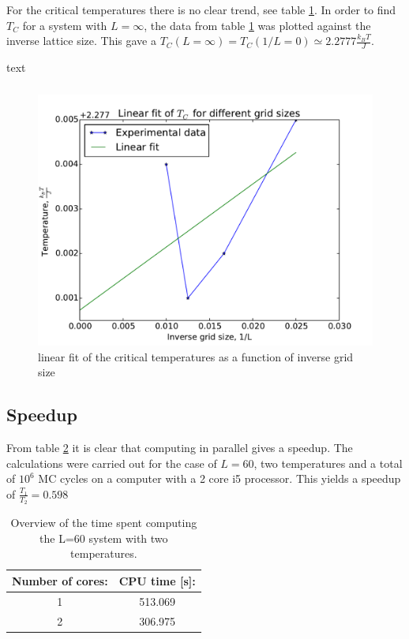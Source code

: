 For the critical temperatures there is no clear trend, see table \ref{tab: T_C}. In order to find $ T_C $ for a system with $ L=\infty $, the data from table \ref{tab: T_C} was plotted against the inverse lattice size. This gave a $ T_C(L = \infty) =T_C(1/L = 0) \simeq 2.2777  \frac{k_BT}{J}  $. 

\begin{table}[H]
	\caption{text}
	\label{tab: T_C}
	\begin{tabular}{cccccc}
		
	\end{tabular}
\end{table}


\begin{figure}[H]
	\centering
	\includegraphics[width=0.7\linewidth]{../results/4e/linfit}
	\caption{linear fit of the critical temperatures as a function of inverse grid size}
	\label{fig:linfit}
\end{figure}




\subsection{Speedup}
From table \ref{tab:speedy} it is clear that computing in parallel gives a speedup. The calculations were carried out for  the case of $ L=60 $, two temperatures and a total of $ 10^6 $ MC cycles on a computer with a 2 core i5 processor. This yields a speedup of $ \frac{T_1}{T_2} = 0.598  $

\begin{table}[H]\caption{Overview of the time spent computing the L=60 system with two temperatures.} \label{tab:speedy}
	\begin{tabular}{cc}
		Number of cores:& CPU time [s]: \\ \hline
		1 & 513.069\\
		2 & 306.975\\
	\end{tabular}
\end{table}

